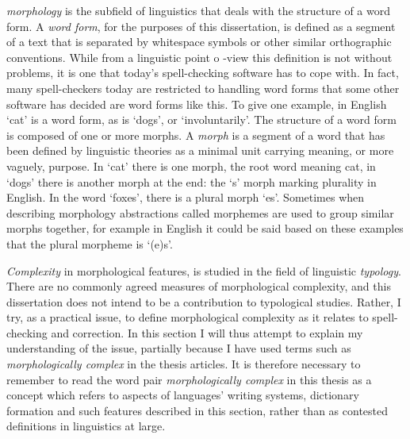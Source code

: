 \documentclass[officiallayout,final]{unihelcompling}
\begin{document}
\emph{\Gls{morphology}} is the subfield of linguistics that deals with the
structure of a word form. A \emph{\gls{word form}}, for the purposes of this
dissertation, is defined as a segment of a text that is separated by whitespace
symbols or other similar orthographic conventions. While from a linguistic
point o -view this definition is not without problems, it is one that today's
spell-checking software has to cope with. In fact, many
spell-checkers today are restricted to handling word forms that some other
software has decided are word forms like this. To give one example, in English
`cat' is a word form, as is `dogs', or `involuntarily'. The structure of a
word form is composed of one or more morphs. A \emph{\gls{morph}} is a segment
of a word that has been defined by linguistic theories as a minimal unit carrying
meaning, or more vaguely, purpose. In `cat' there is one morph, the root word
meaning cat, in `dogs' there is another morph at the end: the `s' morph marking
plurality in English. In the word `foxes', there is a plural morph `es'. Sometimes
when describing morphology abstractions called \glspl{morpheme} are used to
group similar morphs together, for example in English it could be said based
on these examples that the plural morpheme is `(e)s'.

\emph{Complexity} in morphological features, is studied in the field of
linguistic \emph{typology}. There are no commonly agreed measures of
morphological complexity, and this dissertation does not intend to be a
contribution to typological studies. Rather, I try, as a practical issue, to
define morphological complexity as it relates to spell-checking and correction.
In this section I will thus attempt to explain my understanding of the issue,
partially because I have used terms such as \emph{morphologically complex} in
the thesis articles. It is therefore necessary to remember to read the word
pair \emph{morphologically complex} in this thesis as a concept which refers to
aspects of languages' writing systems, dictionary formation and such features
described in this section, rather than as contested definitions in linguistics
at large.
\end{document}
